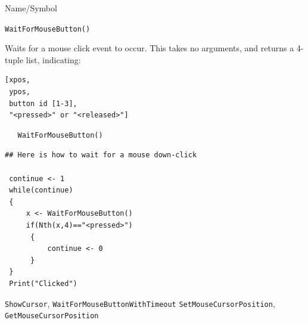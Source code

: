 \begin{desc}{Name/Symbol}
\item[Name/Symbol]	\verb+WaitForMouseButton()+

\item[Description] Waits for a mouse click event to occur.
  This takes no arguments, and returns a 4-tuple list, indicating:

\begin{verbatim}
[xpos, 
 ypos, 
 button id [1-3], 
 "<pressed>" or "<released>"]
\end{verbatim}

\item[Usage]
\begin{verbatim}
   WaitForMouseButton()
\end{verbatim}

\item[Example]	
\begin{verbatim}
## Here is how to wait for a mouse down-click

 continue <- 1
 while(continue)
 {
     x <- WaitForMouseButton()
     if(Nth(x,4)=="<pressed>")
      {
          continue <- 0
      }
 }
 Print("Clicked")
\end{verbatim}


\item[See Also]
  \verb+ShowCursor+, \verb+WaitForMouseButtonWithTimeout+
  \verb+SetMouseCursorPosition+, \verb+GetMouseCursorPosition+
\end{desc}



